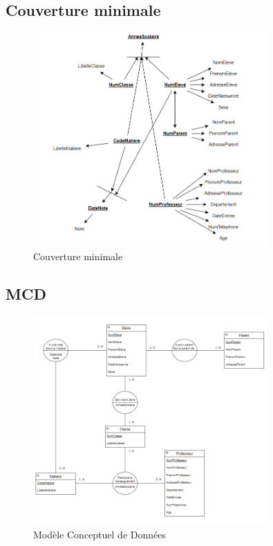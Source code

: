 \documentclass[a4paper,12pt]{article}
\begin{document}
\subsection{Couverture minimale}

\begin{figure}[H]
  \centering
  \includegraphics[width=0.8\textwidth]{img/couv.png}
  \caption{Couverture minimale}
\end{figure}

\subsection{MCD}

\begin{figure}[H]
  \centering
  \includegraphics[width=0.8\textwidth]{img/mcd.png}
  \caption{Modèle Conceptuel de Données}
\end{figure}
\end{document}
